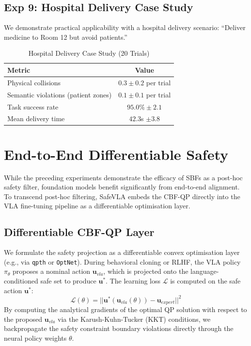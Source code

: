 \documentclass[conference]{IEEEtran}
\begin{document}
\subsection{Exp 9: Hospital Delivery Case Study}
We demonstrate practical applicability with a hospital delivery scenario: ``Deliver medicine to Room 12 but avoid patients.''

\begin{table}[h]
\centering
\caption{Hospital Delivery Case Study (20 Trials)}
\begin{tabular}{lc}
\toprule
\textbf{Metric} & \textbf{Value} \\
\midrule
Physical collisions & $0.3 \pm 0.2$ per trial \\
Semantic violations (patient zones) & $0.1 \pm 0.1$ per trial \\
Task success rate & $95.0\% \pm 2.1$ \\
Mean delivery time & $42.3$s $\pm 3.8$ \\
\bottomrule
\end{tabular}
\end{table}

\section{End-to-End Differentiable Safety}
While the preceding experiments demonstrate the efficacy of SBFs as a post-hoc safety filter, foundation models benefit significantly from end-to-end alignment. To transcend post-hoc filtering, SafeVLA embeds the CBF-QP directly into the VLA fine-tuning pipeline as a differentiable optimisation layer.

\subsection{Differentiable CBF-QP Layer}
We formulate the safety projection as a differentiable convex optimisation layer (e.g., via \texttt{qpth} or \texttt{OptNet}). During behavioral cloning or RLHF, the VLA policy $\pi_\theta$ proposes a nominal action $\mathbf{u}_{vla}$, which is projected onto the language-conditioned safe set to produce $\mathbf{u}^*$. The learning loss $\mathcal{L}$ is computed on the safe action $\mathbf{u}^*$:
\begin{equation}
\mathcal{L}(\theta) = || \mathbf{u}^*(\mathbf{u}_{vla}(\theta)) - \mathbf{u}_{expert} ||^2
\end{equation}
By computing the analytical gradients of the optimal QP solution with respect to the proposed $\mathbf{u}_{vla}$ via the Karush-Kuhn-Tucker (KKT) conditions, we backpropagate the safety constraint boundary violations directly through the neural policy weights $\theta$.
\end{document}
